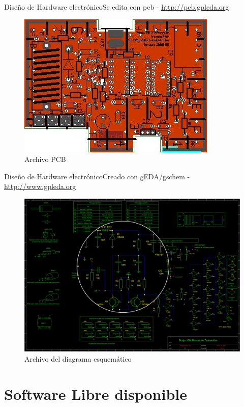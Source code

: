 \documentclass{beamer}
\begin{document}
\begin{frame}{Diseño de Hardware electrónico}{Se edita con \alert{pcb} - \url{http://pcb.gpleda.org}}
  \begin{figure}
    \includegraphics[scale=0.65]{transmisor/metropolis_transmitter}
    \caption{Archivo PCB}
  \end{figure}
\end{frame}

\begin{frame}{Diseño de Hardware electrónico}{Creado con \alert{gEDA/gschem} - \url{http://www.gpleda.org}}
  \begin{figure}
    \includegraphics[scale=0.21]{transmisor/transmisor_esquema}
    \caption{Archivo del diagrama esquemático}
  \end{figure}
\end{frame}

\section{Software Libre disponible}
\end{document}
